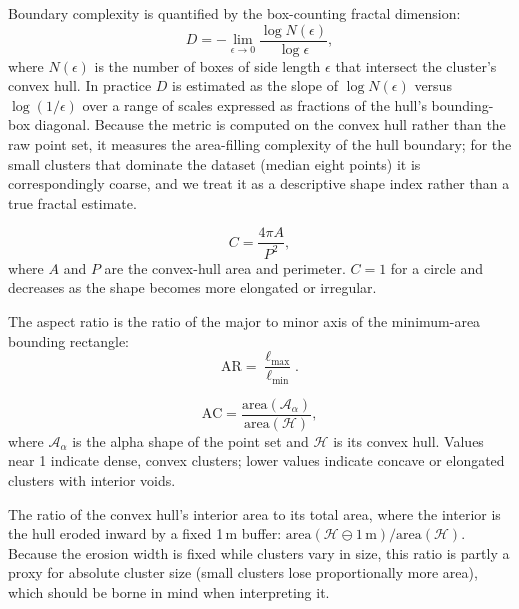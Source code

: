 \documentclass[twocolumn]{article}
\begin{document}
Boundary complexity is quantified by the box-counting fractal dimension:
\begin{equation}
  D = -\lim_{\epsilon \to 0}
      \frac{\log N(\epsilon)}{\log \epsilon},
\end{equation}
where $N(\epsilon)$ is the number of boxes of side length $\epsilon$ that intersect the
cluster's convex hull. In practice $D$ is estimated as the slope of
$\log N(\epsilon)$ versus $\log(1/\epsilon)$ over a range of scales expressed as fractions of
the hull's bounding-box diagonal. Because the metric is computed on the convex hull rather than
the raw point set, it measures the area-filling complexity of the hull boundary; for the small
clusters that dominate the dataset (median eight points) it is correspondingly coarse, and we
treat it as a descriptive shape index rather than a true fractal estimate.

\begin{equation}
  C = \frac{4\pi A}{P^2},
\end{equation}
where $A$ and $P$ are the convex-hull area and perimeter. $C = 1$ for a circle and
decreases as the shape becomes more elongated or irregular.

The aspect ratio is the ratio of the major to minor axis of the minimum-area bounding
rectangle:
\begin{equation}
  \mathrm{AR} = \frac{\ell_{\max}}{\ell_{\min}}.
\end{equation}

\begin{equation}
  \mathrm{AC} = \frac{\mathrm{area}(\mathcal{A}_\alpha)}{\mathrm{area}(\mathcal{H})},
\end{equation}
where $\mathcal{A}_\alpha$ is the alpha shape of the point set and $\mathcal{H}$ is its
convex hull. Values near 1 indicate dense, convex clusters; lower values indicate
concave or elongated clusters with interior voids.

The ratio of the convex hull's interior area to its total area, where the interior is the hull
eroded inward by a fixed 1\,m buffer: $\mathrm{area}(\mathcal{H} \ominus 1\,\mathrm{m})/\mathrm{area}(\mathcal{H})$.
Because the erosion width is fixed while clusters vary in size, this ratio is partly a proxy for
absolute cluster size (small clusters lose proportionally more area), which should be borne in
mind when interpreting it.
\end{document}
